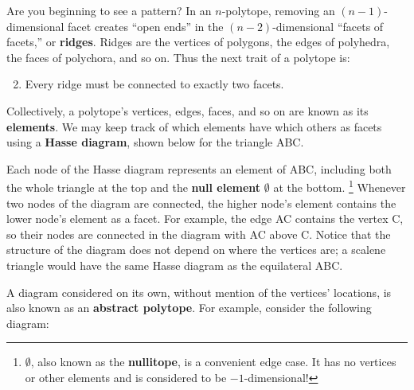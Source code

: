 \documentclass{article}
\begin{document}
Are you beginning to see a pattern?
In an $n$-polytope, removing an $(n-1)$-dimensional facet
creates ``open ends'' in the $(n-2)$-dimensional ``facets of facets,'' or \textbf{ridges}.
Ridges are the vertices of polygons, the edges of polyhedra, the faces of polychora, and so on.
Thus the next trait of a polytope is:
\begin{enumerate}
  \setcounter{enumi}{1}
\item Every ridge must be connected to exactly two facets.
\end{enumerate}

Collectively, a polytope's vertices, edges, faces,
and so on are known as its \textbf{elements}.
We may keep track of which elements have which others as facets using a \textbf{Hasse diagram},
shown below for the triangle ABC.

\begin{center}
\end{center}

Each node of the Hasse diagram represents an element of ABC,
including both the whole triangle at the top
and the \textbf{null element} $\emptyset$ at the bottom.
\footnote{
  $\emptyset$, also known as the \textbf{nullitope}, is a convenient edge case.
  It has no vertices or other elements and is considered to be $-1$-dimensional!
}
Whenever two nodes of the diagram are connected,
the higher node's element contains the lower node's element as a facet.
For example, the edge AC contains the vertex C,
so their nodes are connected in the diagram with AC above C.
Notice that the structure of the diagram does not depend on where the vertices are;
a scalene triangle would have the same Hasse diagram as the equilateral ABC.

A diagram considered on its own, without mention of the vertices' locations,
is also known as an \textbf{abstract polytope}.
For example, consider the following diagram:

\begin{center}
\end{center}
\end{document}
